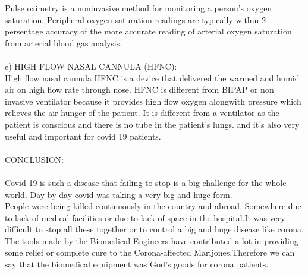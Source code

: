 \documentclass{article}
\begin{document}
Pulse oximetry is a noninvasive method for monitoring a person's oxygen saturation. Peripheral oxygen saturation readings are typically within 2 persentage accuracy of the more accurate reading of arterial oxygen saturation from arterial blood gas analysis.\\
\\
e) HIGH FLOW NASAL CANNULA (HFNC):\\
 High flow nasal cannula HFNC is a device that delivered the warmed and humid air on high flow rate through nose. HFNC is different from BIPAP or non invasive ventilator because it provides high flow oxygen alongwith pressure which relieves the air hunger of the patient. It is different from a ventilator as the patient is conscious and there is no tube in the patient's lungs. and it's also very useful and important for covid 19 patients.\\
\\


CONCLUSION:\\
\\
Covid 19 is such a disease that failing to stop is a big challenge for the whole world.  Day by day covid was taking a very big and huge form.\\
People were being killed continuously in the country and abroad.  Somewhere due to lack of medical facilities or due to lack of space in the hospital.It was very difficult to stop all these together or to control a big and huge disease like corona.\\
The tools made by the Biomedical Engineers have contributed a lot in providing some relief or complete cure to the Corona-affected Marijones.Therefore we can say that the biomedical equipment was God's goods for corona patients.






%
%
\end{document}
